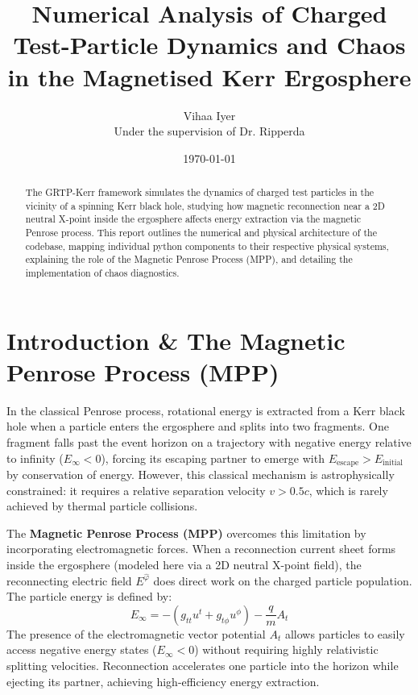 \documentclass[11pt,a4paper]{article}
\title{Numerical Analysis of Charged Test-Particle Dynamics and Chaos in the Magnetised Kerr Ergosphere}
\author{Vihaa Iyer \\ \small Under the supervision of Dr. Ripperda}
\date{\today}
\begin{document}
\maketitle

\begin{abstract}
The GRTP-Kerr framework simulates the dynamics of charged test particles in the vicinity of a spinning Kerr black hole, studying how magnetic reconnection near a 2D neutral X-point inside the ergosphere affects energy extraction via the magnetic Penrose process. This report outlines the numerical and physical architecture of the codebase, mapping individual python components to their respective physical systems, explaining the role of the Magnetic Penrose Process (MPP), and detailing the implementation of chaos diagnostics.
\end{abstract}

\section{Introduction \& The Magnetic Penrose Process (MPP)}
In the classical Penrose process, rotational energy is extracted from a Kerr black hole when a particle enters the ergosphere and splits into two fragments. One fragment falls past the event horizon on a trajectory with negative energy relative to infinity ($E_\infty < 0$), forcing its escaping partner to emerge with $E_{\text{escape}} > E_{\text{initial}}$ by conservation of energy. However, this classical mechanism is astrophysically constrained: it requires a relative separation velocity $v > 0.5c$, which is rarely achieved by thermal particle collisions.

The \textbf{Magnetic Penrose Process (MPP)} overcomes this limitation by incorporating electromagnetic forces. When a reconnection current sheet forms inside the ergosphere (modeled here via a 2D neutral X-point field), the reconnecting electric field $E^{\hat{\varphi}}$ does direct work on the charged particle population. The particle energy is defined by:
\begin{equation}
    E_\infty = - \left( g_{tt} u^t + g_{t\phi} u^\phi \right) - \frac{q}{m} A_t
\end{equation}
The presence of the electromagnetic vector potential $A_t$ allows particles to easily access negative energy states ($E_\infty < 0$) without requiring highly relativistic splitting velocities. Reconnection accelerates one particle into the horizon while ejecting its partner, achieving high-efficiency energy extraction.
\end{document}
